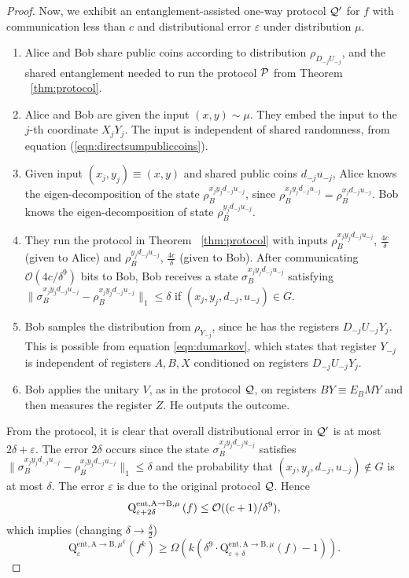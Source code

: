 \documentclass[11pt,a4paper]{article}
\def\P{\CMcal{P}}
\def\Q{\CMcal{Q}}
\def\O{\CMcal{O}}
\theoremstyle{plain}
\theoremstyle{definition}
\newcommand {\br} [1] {\ensuremath{ \left( #1 \right) }}
\def\ve{{\varepsilon}}
\newcommand{\dqcc}[3]{\mathrm{Q}^{\text{ent},\text{A}\rightarrow\text{B} #1}_{#2}\br{#3}}
\begin{document}
\begin{proof}
Now, we exhibit an entanglement-assisted one-way protocol $\Q'$ for $f$ with communication less than $c$ and distributional error $\ve$ under distribution $\mu$. 
\begin{mdframed}
\bigskip
\begin{enumerate}
\item Alice and Bob share public coins according to distribution $\rho_{D_{-j}U_{-j}}$, and the shared entanglement needed to run the protocol $\P$ from Theorem ~\ref{thm:protocol}.
\item Alice and Bob are given the input  $(x,y)\sim\mu$. They embed the input to the $j$-th coordinate $X_jY_j$. The input is independent of shared randomness, from equation (\ref{eqn:directsumpubliccoins}). 
\item Given input $(x_j,y_j)\equiv (x,y)$ and shared public coins $d_{-j}u_{-j}$, Alice knows the eigen-decomposition of the state $\rho_B^{x_jy_jd_{-j}u_{-j}}$, since $\rho_B^{x_jy_jd_{-j}u_{-j}}=\rho_B^{x_jd_{-j}u_{-j}}$. Bob knows the eigen-decomposition of state $\rho_{B}^{y_jd_{-j}u_{-j}}$.
\item They  run the protocol in Theorem ~\ref{thm:protocol} with inputs $\rho_B^{x_jy_jd_{-j}u_{-j}}$, $\frac{4c}{\delta}$ (given to Alice) and $\rho_B^{y_jd_{-j}u_{-j}}$, $\frac{4c}{\delta}$ (given to Bob). After communicating $\mathcal{O}(4c/\delta^9)$  bits to Bob, Bob receives a state $\sigma_B^{x_jy_jd_{-j}u_{-j}}$ satisfying $\|\sigma_B^{x_jy_jd_{-j}u_{-j}}-\rho_B^{x_jy_jd_{-j}u_{-j}}\|_1\leq \delta$ if $(x_j,y_j,d_{-j},u_{-j})\in G$. 
\item Bob samples the distribution from $\rho_{Y_{-j}}$, since he has the registers $D_{-j}U_{-j}Y_j$. This is possible from equation \ref{eqn:dumarkov}, which states that register $Y_{-j}$ is independent of registers $A,B,X$ conditioned on registers $D_{-j}U_{-j}Y_j$. 
\item Bob applies the unitary $V$, as in the protocol $\Q$, on registers $BY\equiv E_BMY$ and then measures the register $Z$. He outputs the outcome. 
\end{enumerate}
\end{mdframed}
\bigskip
From the protocol, it is clear that overall distributional error in $\Q'$ is at most $2\delta+\ve$. The error $2\delta$ occurs since the state $\sigma_B^{x_jy_jd_{-j}u_{-j}}$ satisfies $\|\sigma_B^{x_jy_jd_{-j}u_{-j}}-\rho_B^{x_jy_jd_{-j}u_{-j}}\|_1\leq \delta$ and the probability that $(x_j,y_j,d_{-j},u_{-j})\notin G$ is at most $\delta$. The error $\ve$ is due to the original protocol $\Q$.
Hence 
\[\dqcc{, \mu}{\ve+2\delta}{f}\leq \O((c+1)/\delta^9),\]
which implies (changing $\delta\rightarrow \frac{\delta}{2}$)
\[\dqcc{, \mu^k}{\ve}{f^k}\geq\Omega \br{k \br{\delta^9\cdot\dqcc{, \mu}{\ve+\delta}{f}-1}}.\]
\end{proof}
\end{document}
